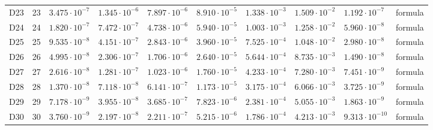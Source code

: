 {\begin{longtable}{@{}llllllllll@{}}
D23 & 23 & $3.475\cdot 10^{-7}$ & $1.345\cdot 10^{-6}$ & $7.897\cdot 10^{-6}$ & $8.910\cdot 10^{-5}$ & $1.338\cdot 10^{-3}$ & $1.509\cdot 10^{-2}$ & $1.192\cdot 10^{-7}$ & formula \\
D24 & 24 & $1.820\cdot 10^{-7}$ & $7.472\cdot 10^{-7}$ & $4.738\cdot 10^{-6}$ & $5.940\cdot 10^{-5}$ & $1.003\cdot 10^{-3}$ & $1.258\cdot 10^{-2}$ & $5.960\cdot 10^{-8}$ & formula \\
D25 & 25 & $9.535\cdot 10^{-8}$ & $4.151\cdot 10^{-7}$ & $2.843\cdot 10^{-6}$ & $3.960\cdot 10^{-5}$ & $7.525\cdot 10^{-4}$ & $1.048\cdot 10^{-2}$ & $2.980\cdot 10^{-8}$ & formula \\
D26 & 26 & $4.995\cdot 10^{-8}$ & $2.306\cdot 10^{-7}$ & $1.706\cdot 10^{-6}$ & $2.640\cdot 10^{-5}$ & $5.644\cdot 10^{-4}$ & $8.735\cdot 10^{-3}$ & $1.490\cdot 10^{-8}$ & formula \\
D27 & 27 & $2.616\cdot 10^{-8}$ & $1.281\cdot 10^{-7}$ & $1.023\cdot 10^{-6}$ & $1.760\cdot 10^{-5}$ & $4.233\cdot 10^{-4}$ & $7.280\cdot 10^{-3}$ & $7.451\cdot 10^{-9}$ & formula \\
D28 & 28 & $1.370\cdot 10^{-8}$ & $7.118\cdot 10^{-8}$ & $6.141\cdot 10^{-7}$ & $1.173\cdot 10^{-5}$ & $3.175\cdot 10^{-4}$ & $6.066\cdot 10^{-3}$ & $3.725\cdot 10^{-9}$ & formula \\
D29 & 29 & $7.178\cdot 10^{-9}$ & $3.955\cdot 10^{-8}$ & $3.685\cdot 10^{-7}$ & $7.823\cdot 10^{-6}$ & $2.381\cdot 10^{-4}$ & $5.055\cdot 10^{-3}$ & $1.863\cdot 10^{-9}$ & formula \\
D30 & 30 & $3.760\cdot 10^{-9}$ & $2.197\cdot 10^{-8}$ & $2.211\cdot 10^{-7}$ & $5.215\cdot 10^{-6}$ & $1.786\cdot 10^{-4}$ & $4.213\cdot 10^{-3}$ & $9.313\cdot 10^{-10}$ & formula \\
\end{longtable}}

